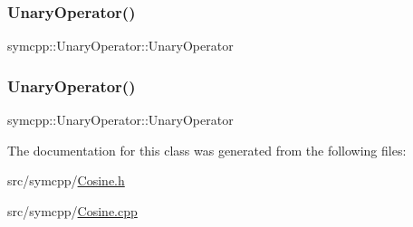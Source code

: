 \subsubsection{\texorpdfstring{UnaryOperator()}{UnaryOperator()}\hspace{0.1cm}{\footnotesize\ttfamily [1/2]}}
{\footnotesize\ttfamily symcpp\+::\+Unary\+Operator\+::\+Unary\+Operator\hspace{0.3cm}{\ttfamily [inline]}}

\mbox{\label{classsymcpp_1_1Cosine_a23a8172db96675ebf1114f4f3f41b6f1}} 
\subsubsection{\texorpdfstring{UnaryOperator()}{UnaryOperator()}\hspace{0.1cm}{\footnotesize\ttfamily [2/2]}}
{\footnotesize\ttfamily symcpp\+::\+Unary\+Operator\+::\+Unary\+Operator\hspace{0.3cm}{\ttfamily [inline]}}



The documentation for this class was generated from the following files\+:\begin{DoxyCompactItemize}
\item 
src/symcpp/\mbox{\hyperlink{Cosine_8h}{Cosine.\+h}}\item 
src/symcpp/\mbox{\hyperlink{Cosine_8cpp}{Cosine.\+cpp}}\end{DoxyCompactItemize}
